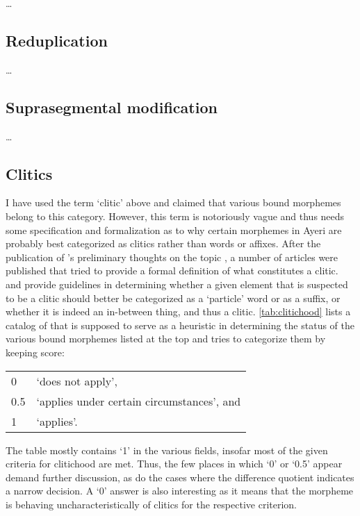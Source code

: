 …

\subsection{Reduplication}

…

\subsection{Suprasegmental modification}

…

\subsection{Clitics}

I have used the term `clitic' above and claimed that various bound morphemes 
belong to this category. However, this term is notoriously vague and thus needs 
some specification and formalization as to why certain morphemes in Ayeri are 
probably best categorized as clitics rather than words or affixes. After the 
publication of \citeauthor{zwicky1977}'s preliminary thoughts on the topic 
\citep{zwicky1977}, a number of articles were published that tried to provide a 
formal definition of what constitutes a clitic. \citet{zwicky1985} and 
\citet{klavans1985} provide guidelines in determining whether a given element 
that is suspected to be a clitic should better be categorized as a `particle' 
word or as a suffix, or whether it is indeed an in-between thing, and thus a 
clitic. \autoref{tab:clitichood} lists a catalog of 
 that is supposed to serve as a 
heuristic in determining the status of the various bound morphemes listed at 
the top and tries to categorize them by keeping score:

\begin{longtabu} to .75\linewidth {X[1r] X[4l]}
0 & `does not apply',\\
0.5 & `applies under certain circumstances', and\\
1 & `applies'.\\
\end{longtabu}\addtocounter{table}{-1}

The table mostly contains `1' in the various fields, insofar most of the given 
criteria for clitichood are met. Thus, the few places in which `0' or `0.5' 
appear demand further discussion, as do the cases where the difference 
quotient indicates a narrow decision. A `0' answer is also interesting as it 
means that the morpheme is behaving uncharacteristically of clitics for the 
respective criterion.

